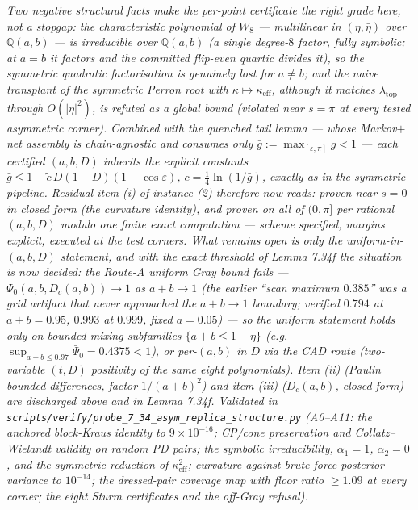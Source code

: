 \documentclass[
]{article}
\begin{document}
\emph{Two negative structural facts make the per-point certificate the
right grade here, not a stopgap: the characteristic polynomial of $W_8$ ---
multilinear in $(\eta,\bar\eta)$ over $\mathbb Q(a,b)$ --- is
\emph{irreducible} over $\mathbb Q(a,b)$ (a single degree-$8$ factor,
fully symbolic; at $a=b$ it factors and the committed flip-even quartic
divides it), so the symmetric quadratic factorisation is genuinely lost for
$a\ne b$; and the naive transplant of the symmetric Perron root with
$\kappa\mapsto\kappa_{\mathrm{eff}}$, although it matches
$\lambda_{\mathrm{top}}$ through $O(|\eta|^2)$, is \emph{refuted} as a
global bound (violated near $s=\pi$ at every tested asymmetric corner).
Combined with the quenched tail lemma --- whose Markov$+$net assembly is
chain-agnostic and consumes only $\bar g:=\max_{[\varepsilon,\pi]}g<1$ ---
each certified $(a,b,D)$ inherits the explicit constants
$\bar g\le1-\tilde c\,D(1-D)(1-\cos\varepsilon)$,
$c=\tfrac14\ln(1/\bar g)$, exactly as in the symmetric pipeline. Residual
item (i) of instance (2) therefore now reads: \emph{proven near $s=0$ in
closed form (the curvature identity), and proven on all of $(0,\pi]$ per
rational $(a,b,D)$ modulo one finite exact computation --- scheme specified,
margins explicit, executed at the test corners}. What remains open is only
the \emph{uniform-in-$(a,b,D)$} statement, and with the exact threshold of
Lemma 7.34f the situation is now \emph{decided}: the Route-A uniform Gray
bound \emph{fails} --- $\bar\Psi_0(a,b,D_c(a,b))\to1$ as $a+b\to1$ (the
earlier ``scan maximum $0.385$'' was a grid artifact that never approached
the $a+b\to1$ boundary; verified $0.794$ at $a+b=0.95$, $0.993$ at $0.999$,
fixed $a=0.05$) --- so the uniform statement holds only on \emph{bounded-mixing}
subfamilies $\{a+b\le1-\eta\}$ (e.g.\ $\sup_{a+b\le0.97}\bar\Psi_0=0.4375<1$),
or per-$(a,b)$ in $D$ via the CAD route (two-variable $(t,D)$ positivity of
the same eight polynomials). Item (ii) (Paulin bounded differences, factor
$1/(a+b)^2$) and item (iii) ($D_c(a,b)$, closed form) are discharged above
and in Lemma 7.34f. Validated in
\texttt{scripts/verify/probe\_7\_34\_asym\_replica\_structure.py}
(A0--A11: the anchored block-Kraus identity to $9\times10^{-16}$; CP/cone
preservation and Collatz--Wielandt validity on random PD pairs; the
symbolic irreducibility, $\alpha_1=1$, $\alpha_2=0$, and the symmetric
reduction of $\kappa_{\mathrm{eff}}^2$; curvature against brute-force
posterior variance to $10^{-14}$; the dressed-pair coverage map with floor
ratio $\ge1.09$ at every corner; the eight Sturm certificates and the
off-Gray refusal).}
\end{document}
